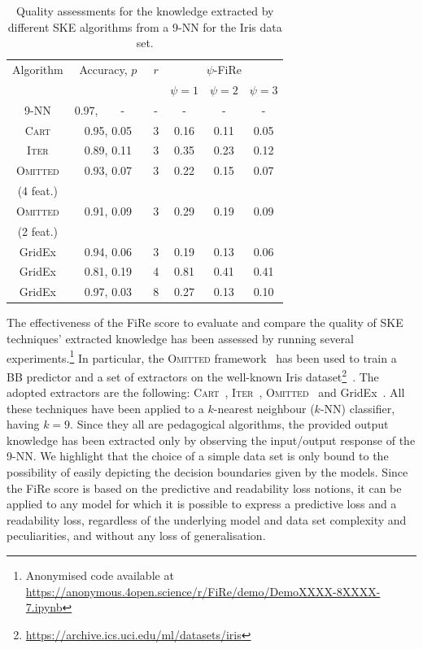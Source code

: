 \documentclass{article}
\newcommand{\psyke}{\textsc{Omitted}}%
\newcommand{\iter}{\textsc{Iter}}
\newcommand{\gridex}{GridEx}
\newcommand{\creepy}{\textsc{Omitted}} %
\newcommand{\cart}{\textsc{Cart}}
\newcommand{\fire}{FiRe}
\newcommand{\psifire}{$\psi$-\fire}
\begin{document}
\begin{table}[t]\centering
	\begin{tabular}{|c|c|c|c|c|c|}
		\toprule
		Algorithm & Accuracy, $p$ & $r$ & \multicolumn{3}{c|}{\psifire{}} \\
		& & & $\psi=1$ & $\psi=2$ & $\psi=3$ \\
		\midrule\midrule
		9-NN & 0.97,~~~~-~~~ & - & - & - & - \\
		\cart{} & 0.95, 0.05 & 3 & 0.16 & 0.11 & 0.05 \\
		\iter{} & 0.89, 0.11 & 3 & 0.35 & 0.23 & 0.12 \\
		\creepy{} & 0.93, 0.07 & 3 & 0.22 & 0.15 & 0.07 \\
		(4 feat.) & & & & & \\
		\creepy{} & 0.91, 0.09 & 3 & 0.29 & 0.19 & 0.09 \\
		(2 feat.) & & & & & \\
		\gridex{} & 0.94, 0.06 & 3 & 0.19 & 0.13 & 0.06 \\
		\gridex{} & 0.81, 0.19 & 4 & 0.81 & 0.41 & 0.41 \\
		\gridex{} & 0.97, 0.03 & 8 & 0.27 & 0.13 & 0.10 \\
		\bottomrule
	\end{tabular}
	\caption{Quality assessments for the knowledge extracted by different SKE algorithms from a 9-NN for the Iris data set.}
	\label{tab:experiments}
\end{table}

The effectiveness of the \fire{} score to evaluate and compare the quality of SKE techniques' extracted knowledge has been assessed by running several experiments.\footnote{Anonymised code available at \url{https://anonymous.4open.science/r/FiRe/demo/DemoXXXX-8XXXX-7.ipynb}}
%
In particular, the \psyke{} framework~\cite{putCitations} has been used to train a BB predictor and a set of extractors on the well-known Iris dataset\footnote{\url{https://archive.ics.uci.edu/ml/datasets/iris}}~\cite{iris}.%
%
The adopted extractors are the following: \cart{}~\cite{breiman1984classification}, \iter{}~\cite{huysmans2006iter}, \creepy{}~\cite{putCitations} and \gridex{}~\cite{gridex-extraamas2021}.
%
All these techniques have been applied to a $k$-nearest neighbour ($k$-NN) classifier, having $k=9$.
%
Since they all are pedagogical algorithms, the provided output knowledge has been extracted only by observing the input/output response of the 9-NN.
%
We highlight that the choice of a simple data set is only bound to the possibility of easily depicting the decision boundaries given by the models.
%
Since the \fire{} score is based on the predictive and readability loss notions, it can be applied to any model for which it is possible to express a predictive loss and a readability loss, regardless of the underlying model and data set complexity and peculiarities, and without any loss of generalisation.
\end{document}
